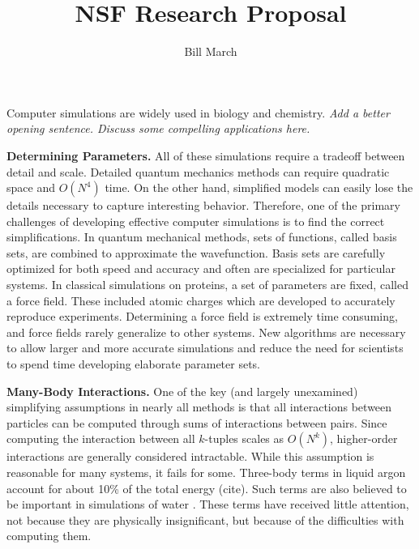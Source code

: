 \documentclass[twoside,leqno, 12pt]{article}
\title{NSF Research Proposal}
\author{Bill March}
\date{}                                           %
\begin{document}
\maketitle




Computer simulations are widely used in biology and chemistry.  \textit{Add a better opening sentence.  Discuss some compelling applications here.}

\textbf{Determining Parameters.}  All of these simulations require a tradeoff between detail and scale.  Detailed quantum mechanics methods can require quadratic space and $O(N^4)$ time.  On the other hand, simplified models can easily lose the details necessary to capture interesting behavior.  Therefore, one of the primary challenges of developing effective computer simulations is to find the correct simplifications.  In quantum mechanical methods, sets of functions, called basis sets, are combined to approximate the wavefunction.  Basis sets are carefully optimized for both speed and accuracy and often are specialized for particular systems.  In classical simulations on proteins, a set of parameters are fixed, called a force field.  These included atomic charges which are developed to accurately reproduce experiments.  Determining a force field is extremely time consuming, and force fields rarely generalize to other systems.  New algorithms are necessary to allow larger and more accurate simulations and reduce the need for scientists to spend time developing elaborate parameter sets.  

\textbf{Many-Body Interactions.}  One of the key (and largely unexamined) simplifying assumptions in nearly all methods is that all interactions between particles can be computed through sums of interactions between pairs.  Since computing the interaction between all $k$-tuples scales as $O(N^k)$, higher-order interactions are generally considered intractable.  While this assumption is reasonable for many systems, it fails for some.  Three-body terms in liquid argon account for about 10\% of the total energy (cite).  Such terms are also believed to be important in simulations of water \cite{LYBRAND:1985qy}.  These terms have received little attention, not because they are physically insignificant, but because of the difficulties with computing them.
\end{document}
